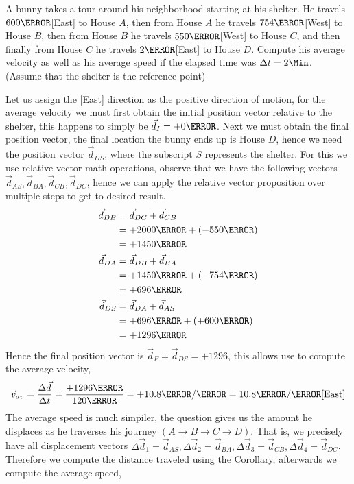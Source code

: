 \documentclass[12pt]{article} %
\newcommand{\tx}[1]{\text{#1}}
\begin{document}
\begin{qstn}[8]
\end{qstn}


\begin{qstn}[9]
A bunny takes a tour around his neighborhood starting at his shelter. He travels $600\m$[East] to House $A$, then from House $A$ he travels $754\m$[West] to House $B$, then from House $B$ he travels $550 \m$[West] to House $C$, and then finally from House $C$ he travels $2\km$[East] to House $D$. Compute his average velocity as well as his average speed if the elapsed time was $\Delta t = 2\Min$. (Assume that the shelter is the reference point)


\begin{soln}
	Let us assign the [East] direction as the positive direction of motion, for the average velocity we must first obtain the initial position vector relative to the shelter, this happens to simply be $\vec d_I = +0\m$. Next we must obtain the final position vector, the final location the bunny ends up is House $D$, hence we need the position vector $\vec d_{DS}$, where the subscript $S$ represents the shelter. For this we use relative vector math operations, observe that we have the following vectors $\vec d_{AS}, \vec d_{BA}, \vec d_{CB}, \vec d_{DC}$, hence we can apply the relative vector proposition over multiple steps to get to desired result. 
	\begin{align*}
		\vec d_{DB} &= \vec d_{DC} + \vec d_{CB}\\
		&= +2000\m + (-550\m) \\
		&= +1450\m\\
		\vec d_{DA} &= \vec d_{DB} + \vec d_{BA}\\
		&= +1450\m + (-754\m)\\
		&= +696\m\\
		\vec d_{DS} &= \vec d_{DA} + \vec d_{AS}\\
		&= +696\m + (+600\m)\\
		&= +1296\m
	\end{align*}
	Hence the final position vector is $\vec d_F = \vec d_{DS} = +1296$, this allows use to compute the average velocity,
$$\vec v_{av} = \frac{\Delta \vec d}{\Delta t} = \frac{+1296\m}{120\s} = +10.8 \m / \s = 10.8 \m / \s \tx{[East]}$$
The average speed is much simpiler, the question gives us the amount he displaces as he traverses his journey $(A \rightarrow B \rightarrow C \rightarrow D)$. That is, we precisely have all displacement vectors $\Delta \vec d_1 = \vec d_{AS}, \Delta \vec d_2 = \vec d_{BA}, \Delta \vec d_3 = \vec d_{CB}, \Delta \vec d_4 = \vec d_{DC}$. Therefore we compute the distance traveled using the Corollary, afterwards we compute the average speed,

\end{soln}
\end{qstn}
\end{document}
